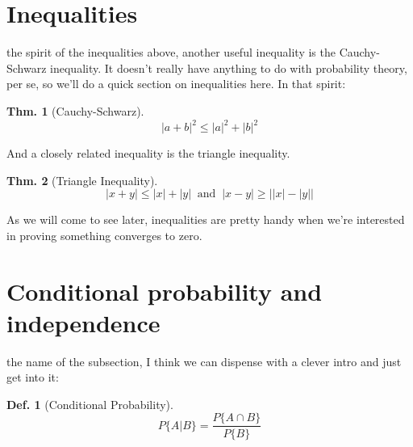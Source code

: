 \documentclass{tufte-book}
\theoremstyle{mytheoremstyle}
\newtheorem*{thm}{Thm.}
\theoremstyle{mylemstyle}
\theoremstyle{mydefstyle}
\newtheorem*{mydef}{Def.}
\begin{document}
\section{Inequalities}
 the spirit of the inequalities above, another useful inequality is the Cauchy-Schwarz inequality. It doesn't really have anything to do with probability theory, per se, so we'll do a quick section on inequalities here. In that spirit:
\begin{thm}[Cauchy-Schwarz]
	\[|a + b|^2 \le |a|^2 + |b|^2\]
\end{thm}
And a closely related inequality is the triangle inequality.
\begin{thm}[Triangle Inequality]\marginnote{\(\bigtriangleup \bigtriangleup \bigtriangleup \bigtriangleup \bigtriangleup \bigtriangleup \bigtriangleup \bigtriangleup \bigtriangleup \bigtriangleup \bigtriangleup \bigtriangleup \bigtriangleup \bigtriangleup \bigtriangleup \bigtriangleup \bigtriangleup \bigtriangleup \bigtriangleup \bigtriangleup \bigtriangleup \bigtriangleup \bigtriangleup \bigtriangleup \bigtriangleup \bigtriangleup \bigtriangleup \bigtriangleup \bigtriangleup \bigtriangleup \bigtriangleup \bigtriangleup \bigtriangleup \bigtriangleup \bigtriangleup \bigtriangleup \bigtriangleup \bigtriangleup \bigtriangleup \bigtriangleup \bigtriangleup \bigtriangleup \bigtriangleup \bigtriangleup \bigtriangleup \bigtriangleup \bigtriangleup \bigtriangleup \bigtriangleup \bigtriangleup \bigtriangleup \bigtriangleup \bigtriangleup \bigtriangleup \bigtriangleup \bigtriangleup \bigtriangleup \bigtriangleup \bigtriangleup \bigtriangleup \bigtriangleup \bigtriangleup \bigtriangleup \bigtriangleup \bigtriangleup \bigtriangleup \bigtriangleup \bigtriangleup \bigtriangleup \bigtriangleup \bigtriangleup \bigtriangleup \bigtriangleup \bigtriangleup \bigtriangleup \bigtriangleup \bigtriangleup \bigtriangleup \bigtriangleup \bigtriangleup\)}
	\[|x+y| \le |x| + |y|\ \text{ and }\ |x - y| \ge \left| |x| - |y| \right|\]
\end{thm}
As we will come to see later, inequalities are pretty handy when we're interested in proving something converges to zero. 

\section{Conditional probability and independence} 
 the name of the subsection, I think we can dispense with a clever intro and just get into it:
\begin{mydef}[Conditional Probability]
	\[P\{A|B\} = \frac{P\{A \cap B\}}{P\{B\}}\]
\end{mydef}
\end{document}
